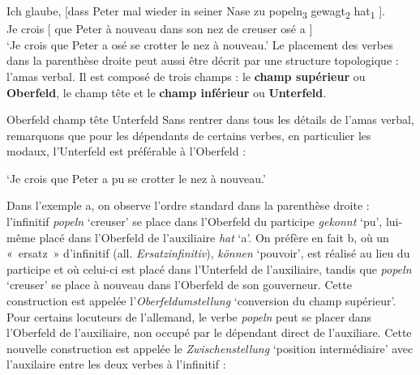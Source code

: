 {    \ea
    \gll  Ich glaube,   [dass Peter mal wieder in seiner Nase zu popeln\textsubscript{3} gewagt\textsubscript{2} hat\textsubscript{1}   ].\\
    Je crois   [ que  Peter à nouveau dans son nez   de creuser  osé        a   ]\\
    ‘Je crois que Peter a osé se crotter le nez à nouveau.’
    \z
    Le placement des verbes dans la parenthèse droite peut aussi être décrit par une structure topologique : l’amas verbal. Il est composé de trois champs : le \textbf{champ supérieur} ou \textbf{Oberfeld}, le champ tête et le \textbf{champ inférieur} ou \textbf{Unterfeld}.


    \ea
    Oberfeld          champ tête            Unterfeld
    \z
    Sans rentrer dans tous les détails de l’amas verbal, remarquons que pour les dépendants de certains verbes, en particulier les modaux, l’Unterfeld est préférable à l’Oberfeld :

    \ea\label{ex:popel}
    \glt  ‘Je crois que Peter a pu se crotter le nez à nouveau.’
    \z
    \z

    Dans l’exemple a, on observe l’ordre standard dans la parenthèse droite : l’infinitif \textit{popeln} ‘creuser’ se place dans l’Oberfeld du participe \textit{gekonnt} ‘pu’, lui-même placé dans l’Oberfeld de l’auxiliaire \textit{hat} ‘a’. On préfère en fait b, où un «~ersatz~» d’infinitif (all. \textit{Ersatzinfinitiv}), \textit{können} ‘pouvoir’, est réalisé au lieu du participe et où celui-ci est placé dans l’Unterfeld de l’auxiliaire, tandis que \textit{popeln} ‘creuser’ se place à nouveau dans l’Oberfeld de son gouverneur. Cette construction est appelée l’\textit{Oberfeldumstellung} ‘conversion du champ supérieur’. Pour certains locuteurs de l’allemand, le verbe \textit{popeln} peut se placer dans l’Oberfeld de l’auxiliaire, non occupé par le dépendant direct de l’auxiliare. Cette nouvelle construction est appelée le \textit{Zwischenstellung} ‘position intermédiaire’ avec l’auxilaire entre les deux verbes à l’infinitif :

}
